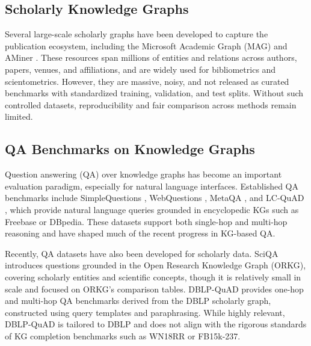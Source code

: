 \documentclass[conference]{IEEEtran}
\begin{document}
\subsection{Scholarly Knowledge Graphs}
Several large-scale scholarly graphs have been developed to capture the publication ecosystem, including the Microsoft Academic Graph (MAG) \cite{wang_microsoftacademicgraph_2020, sinha_overviewmicrosoftacademic_2015} and AMiner \cite{tang_arnetminerextractionmining_2008}. These resources span millions of entities and relations across authors, papers, venues, and affiliations, and are widely used for bibliometrics and scientometrics. However, they are massive, noisy, and not released as curated benchmarks with standardized training, validation, and test splits. Without such controlled datasets, reproducibility and fair comparison across methods remain limited.

\subsection{QA Benchmarks on Knowledge Graphs}
Question answering (QA) over knowledge graphs has become an important evaluation paradigm, especially for natural language interfaces. Established QA benchmarks include SimpleQuestions \cite{bordes_largescalesimplequestion_2015}, WebQuestions \cite{berant_semanticparsingfreebase_2013}, MetaQA \cite{zhang_variationalreasoningquestion_2018}, and LC-QuAD \cite{trivedi_lcquadcorpuscomplex_2017}, which provide natural language queries grounded in encyclopedic KGs such as Freebase or DBpedia. These datasets support both single-hop and multi-hop reasoning and have shaped much of the recent progress in KG-based QA. %

Recently, QA datasets have also been developed for scholarly data. SciQA \cite{auer_sciqascientificquestion_2023} introduces questions grounded in the Open Research Knowledge Graph (ORKG), covering scholarly entities and scientific concepts, though it is relatively small in scale and focused on ORKG’s comparison tables. DBLP-QuAD \cite{banerjee_dblpquadquestionanswering_2023} provides one-hop and multi-hop QA benchmarks derived from the DBLP scholarly graph, constructed using query templates and paraphrasing. While highly relevant, DBLP-QuAD is tailored to DBLP and does not align with the rigorous standards of KG completion benchmarks such as WN18RR or FB15k-237.
\end{document}

